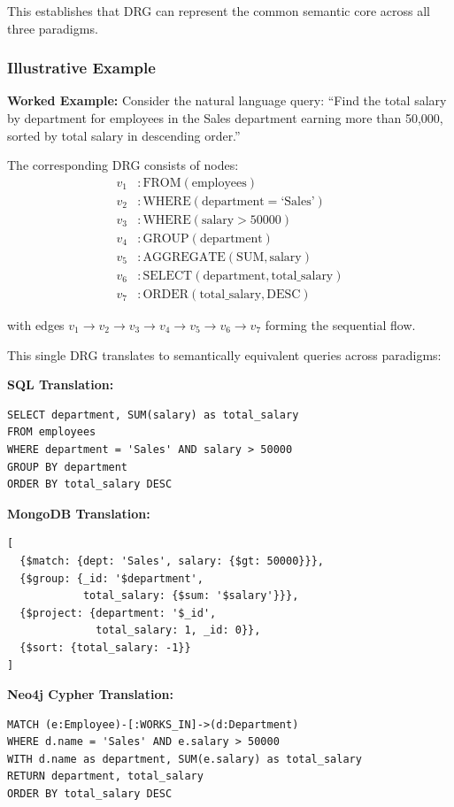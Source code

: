 \documentclass[conference]{IEEEtran}
\begin{document}
This establishes that DRG can represent the common semantic core across all three paradigms.

\subsubsection{Illustrative Example}

\textbf{Worked Example:} Consider the natural language query: ``Find the total salary by department for employees in the Sales department earning more than 50,000, sorted by total salary in descending order.''

The corresponding DRG consists of nodes:
\begin{align*}
v_1 &: \text{FROM}(\text{employees}) \\
v_2 &: \text{WHERE}(\text{department} = \text{`Sales'}) \\
v_3 &: \text{WHERE}(\text{salary} > 50000) \\
v_4 &: \text{GROUP}(\text{department}) \\
v_5 &: \text{AGGREGATE}(\text{SUM}, \text{salary}) \\
v_6 &: \text{SELECT}(\text{department}, \text{total\_salary}) \\
v_7 &: \text{ORDER}(\text{total\_salary}, \text{DESC})
\end{align*}

with edges $v_1 \to v_2 \to v_3 \to v_4 \to v_5 \to v_6 \to v_7$ forming the sequential flow.

This single DRG translates to semantically equivalent queries across paradigms:

\textbf{SQL Translation:}
\begin{verbatim}
SELECT department, SUM(salary) as total_salary
FROM employees
WHERE department = 'Sales' AND salary > 50000
GROUP BY department
ORDER BY total_salary DESC
\end{verbatim}

\textbf{MongoDB Translation:}
\begin{verbatim}
[
  {$match: {dept: 'Sales', salary: {$gt: 50000}}},
  {$group: {_id: '$department', 
            total_salary: {$sum: '$salary'}}},
  {$project: {department: '$_id', 
              total_salary: 1, _id: 0}},
  {$sort: {total_salary: -1}}
]
\end{verbatim}

\textbf{Neo4j Cypher Translation:}
\begin{verbatim}
MATCH (e:Employee)-[:WORKS_IN]->(d:Department)
WHERE d.name = 'Sales' AND e.salary > 50000
WITH d.name as department, SUM(e.salary) as total_salary
RETURN department, total_salary
ORDER BY total_salary DESC
\end{verbatim}
\end{document}
